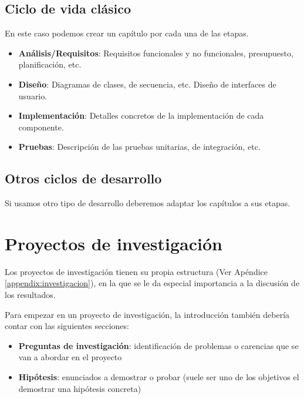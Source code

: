 \subsection{Ciclo de vida clásico}
En este caso podemos crear un capítulo por cada una de las etapas.
                \begin{itemize}
                    \item \textbf{Análisis/Requisitos}: Requisitos funcionales y no funcionales, presupuesto, planificación, etc.
                    \item \textbf{Diseño}: Diagramas de clases, de secuencia, etc. Diseño de interfaces de usuario.
                    \item \textbf{Implementación}: Detalles concretos de la implementación de cada componente.
                    \item \textbf{Pruebas}: Descripción de las pruebas unitarias, de integración, etc.
                \end{itemize}
\subsection{Otros ciclos de desarrollo}
Si usamos otro tipo de desarrollo deberemos adaptar los capítulos a sus etapas.


\section{Proyectos de investigación}
Los proyectos de investigación tienen su propia estructura (Ver Apéndice \ref{appendix:investigacion}), en la que se le da especial importancia a la discusión de los resultados. 

Para empezar en un proyecto de investigación, la introducción también debería contar con las siguientes secciones:
    \begin{itemize}
                \item \textbf{Preguntas de investigación}: identificación de problemas o carencias que se van a abordar en el proyecto 
                \item \textbf{Hipótesis}: enunciados a demostrar o probar (suele ser uno de los objetivos el demostrar una hipótesis concreta)
                
    \end{itemize}

